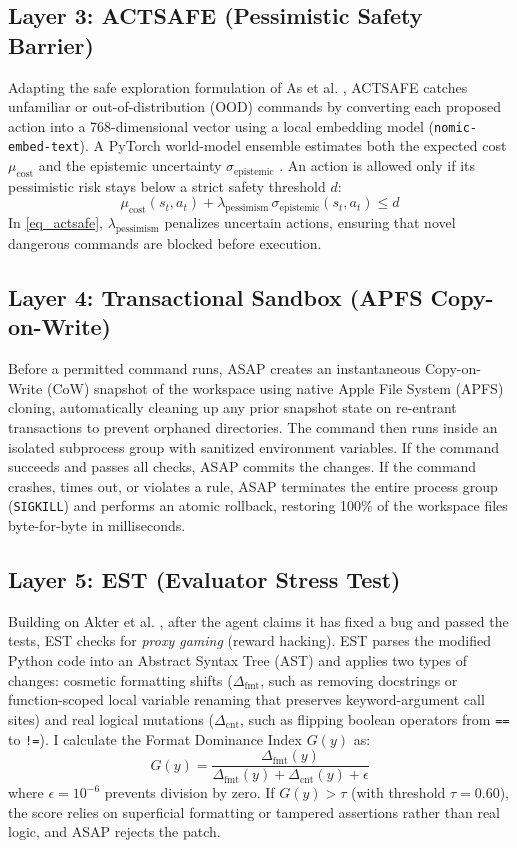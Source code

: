 \documentclass[conference]{IEEEtran}
\begin{document}
\subsection{Layer 3: ACTSAFE (Pessimistic Safety Barrier)}
Adapting the safe exploration formulation of As et al. \cite{as2025actsafe}, ACTSAFE catches unfamiliar or out-of-distribution (OOD) commands by converting each proposed action into a 768-dimensional vector using a local embedding model (\texttt{nomic-embed-text}). A PyTorch world-model ensemble estimates both the expected cost $\mu_{\text{cost}}$ and the epistemic uncertainty $\sigma_{\text{epistemic}}$ \cite{lakshminarayanan2017ensembles}. An action is allowed only if its pessimistic risk stays below a strict safety threshold $d$:
\begin{equation}
\mu_{\text{cost}}(s_t, a_t) + \lambda_{\text{pessimism}}\,\sigma_{\text{epistemic}}(s_t, a_t) \le d\label{eq_actsafe}
\end{equation}
In \eqref{eq_actsafe}, $\lambda_{\text{pessimism}}$ penalizes uncertain actions, ensuring that novel dangerous commands are blocked before execution.

\subsection{Layer 4: Transactional Sandbox (APFS Copy-on-Write)}
Before a permitted command runs, ASAP creates an instantaneous Copy-on-Write (CoW) snapshot of the workspace using native Apple File System (APFS) cloning, automatically cleaning up any prior snapshot state on re-entrant transactions to prevent orphaned directories. The command then runs inside an isolated subprocess group with sanitized environment variables. If the command succeeds and passes all checks, ASAP commits the changes. If the command crashes, times out, or violates a rule, ASAP terminates the entire process group (\texttt{SIGKILL}) and performs an atomic rollback, restoring 100\% of the workspace files byte-for-byte in milliseconds.

\subsection{Layer 5: EST (Evaluator Stress Test)}
Building on Akter et al. \cite{akter2026est}, after the agent claims it has fixed a bug and passed the tests, EST checks for \textit{proxy gaming} (reward hacking). EST parses the modified Python code into an Abstract Syntax Tree (AST) and applies two types of changes: cosmetic formatting shifts ($\Delta_{\text{fmt}}$, such as removing docstrings or function-scoped local variable renaming that preserves keyword-argument call sites) and real logical mutations ($\Delta_{\text{cnt}}$, such as flipping boolean operators from \texttt{==} to \texttt{!=}). I calculate the Format Dominance Index $G(y)$ as:
\begin{equation}
G(y) = \frac{\Delta_{\text{fmt}}(y)}{\Delta_{\text{fmt}}(y) + \Delta_{\text{cnt}}(y) + \epsilon}\label{eq_est}
\end{equation}
where $\epsilon = 10^{-6}$ prevents division by zero. If $G(y) > \tau$ (with threshold $\tau = 0.60$), the score relies on superficial formatting or tampered assertions rather than real logic, and ASAP rejects the patch.
\end{document}
